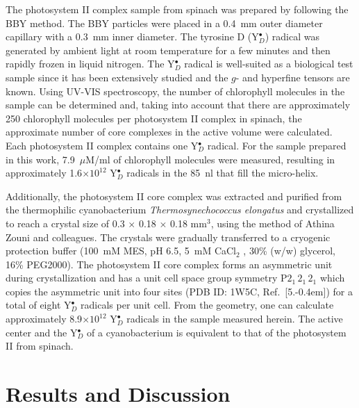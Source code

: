 The photosystem II complex sample from spinach was prepared by following the BBY method. The BBY particles were placed in a 0.4~mm outer diameter capillary with a 0.3~mm inner diameter. \cite{BBY1981} The tyrosine D (Y$_D^\bullet$) radical was generated by ambient light at room temperature for a few minutes and then rapidly frozen in liquid nitrogen. The Y$_D^\bullet$ radical is well-suited as a biological test sample since it has been extensively studied and the $g$- and hyperfine tensors are known. \cite{Hofbauer6623} Using UV-VIS spectroscopy, the number of chlorophyll molecules in the sample can be determined and, taking into account that there are approximately 250 chlorophyll molecules per photosystem II complex in spinach, the approximate number of core complexes in the active volume were calculated. Each photosystem II complex contains one Y$_D^\bullet$ radical. For the sample prepared in this work, 7.9~$\mu$M/ml of chlorophyll molecules were measured, resulting in approximately 1.6$\times10^{12}$ Y$_D^\bullet$ radicals in the 85~nl that fill the micro-helix. 

Additionally, the photosystem II core complex was extracted and purified from the thermophilic cyanobacterium {\em Thermosynechococcus elongatus} and crystallized to reach a crystal size of 0.3 $\times$ 0.18 $\times$ 0.18 mm$^3$, using the method of Athina Zouni and colleagues. \cite{KERN2005147} The crystals were gradually transferred to a cryogenic protection buffer (100~mM MES, pH 6.5, 5~mM CaCl$_2$ , 30\% (w/w) glycerol, 16\% PEG2000). The photosystem II core complex forms an asymmetric unit during crystallization and has a unit cell space group symmetry P${2_1\,2_1\,2_1}$ which copies the asymmetric unit into four sites (PDB ID: 1W5C, Ref.~[5.\kern-0.4em]) for a total of eight Y$_D^\bullet$ radicals per unit cell. From the geometry, one can calculate approximately 8.9$\times10^{12}$ Y$_D^\bullet$ radicals in the sample measured herein. The active center and the Y$_D^\bullet$ of a cyanobacterium is equivalent to that of the photosystem II from spinach. 

\section{Results and Discussion}

